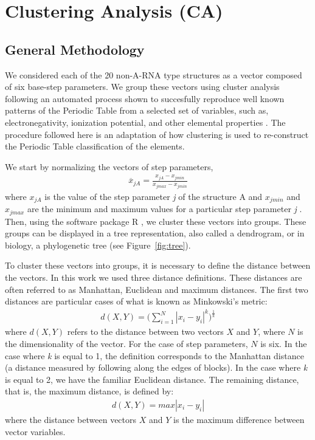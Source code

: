 \chapter{Clustering Analysis (CA)}
\label{appendix_a}

\section{General Methodology}
We considered  each of  the 20 non-A-RNA  type structures as  a vector
composed of  six base-step  parameters.  We group these  vectors using
cluster analysis  following an automated process  shown to succesfully
reproduce well  known patterns of  the Periodic Table from  a selected
set  of variables, such  as, electronegativity,  ionization potential,
and  other elemental  properties  \cite{restrepo2004}.  The  procedure
followed  here  is  an  adaptation   of  how  clustering  is  used  to
re-construct the Periodic Table classification of the elements.

We start by normalizing the vectors of step parameters,
\begin{gather}
\label{eq:normalization}  
\overline{x}_{jA}=\frac{x_{jA}-x_{jmin}}{x_{jmax}-x_{jmin}}
\end{gather}
where ${x}_{jA}$ is the value  of the step parameter \textit{j} of the
structure A and $x_{jmin}$ and  $x_{jmax}$ are the minimum and maximum
values for a particular step parameter \textit{j} \cite{restrepo2006}.
Then,  using  the  software  package \textsf{R}  \cite{ihaka1996},  we
cluster these vectors into groups.  These groups can be displayed in a
tree  representation,  also called  a  dendrogram,  or  in biology,  a
phylogenetic tree (see Figure~\ref{fig:tree}).

To cluster these vectors into groups, it is necessary to define the
distance between  the vectors. In  this work we used  three distance
definitions.   These distances  are  often referred  to as  Manhattan,
Euclidean  and   maximum  distances.  The  first   two  distances  are
particular cases of what is known as Minkowski's metric:
\begin{gather}
d(X,Y)= \Big( \sum_{i=1}^N |x_i-y_i|^k \Big)^\frac{1}{k}
\end{gather}
where $d(X,Y)$ refers to the distance between two vectors $X$ and $Y$,
where $N$ is  the dimensionality of the vector.  For  the case of step
parameters, $N$ is  six.  In the case where \textit{k}  is equal to 1,
the  definition  corresponds to  the  Manhattan  distance (a  distance
measured by  following along the edges  of blocks). In  the case where
\textit{k} is equal to 2, we have the familiar Euclidean distance. The
remaining distance, that is, the maximum distance, is defined by:
\begin{gather}
d(X,Y) = max |x_{i}-y_{i}|
\end{gather}
where  the  distance  between  vectors  $X$ and  $Y$  is  the  maximum
difference between vector variables.

